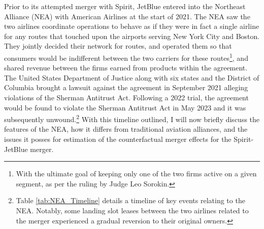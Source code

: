 \documentclass{article}
\begin{document}
	Prior to its attempted merger with Spirit, JetBlue entered into the Northeast Alliance (NEA) with American Airlines at the start of 2021. The NEA saw the two airlines coordinate operations to behave as if they were in fact a single airline for any routes that touched upon the airports serving New York City and Boston. They jointly decided their network for routes, and operated them so that consumers would be indifferent between the two carriers for these routes\footnote{With the ultimate goal of keeping only one of the two firms active on a given segment, as per the ruling by Judge Leo Sorokin.}, and shared revenue between the firms earned from products within the agreement. The United States Department of Justice along with six states and the District of Columbia brought a lawsuit against the agreement in September 2021 alleging violations of the Sherman Antitrust Act. Following a 2022 trial, the agreement would be found to violate the Sherman Antitrust Act in May 2023 and it was subsequently unwound\citep{rennison_jetblue-american_2023, rains_what_2023}.\footnote{Table \ref{tab:NEA_Timeline} details a timeline of key events relating to the NEA. Notably, some landing slot leases between the two airlines related to the merger experienced a gradual reversion to their original owners.} With this timeline outlined, I will now briefly discuss the features of the NEA, how it differs from traditional aviation alliances, and the issues it posses for estimation of the counterfactual merger effects for the Spirit-JetBlue merger. 
\end{document}

